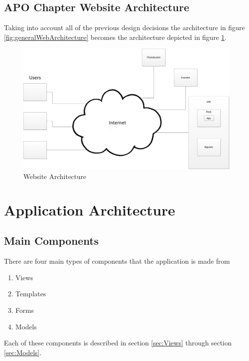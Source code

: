 \documentclass{article}
\begin{document}
\subsection{APO Chapter Website Architecture}

Taking into account all of the previous design decisions the architecture in figure \ref{fig:generalWebArchitecture}
becomes the architecture depicted in figure \ref{fig:finalWebArchitecture}.

\FloatBarrier
\begin{figure}[h!]
\centering
\includegraphics[scale=.6]{img/finalWebArchitecture}
\caption{Website Architecture}
\label{fig:finalWebArchitecture}
\end{figure}
\FloatBarrier

\section{Application Architecture}

\subsection{Main Components}

There are four main types of components that the application is made from

\begin{enumerate}
\item Views
\item Templates
\item Forms
\item Models
\end{enumerate}

Each of these components is described in section \ref{sec:Views} through section \ref{sec:Models}.
\end{document}
